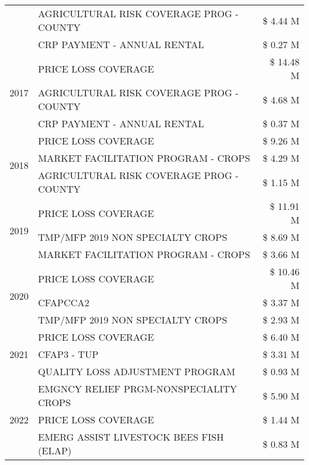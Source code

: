 \begin{tabular}{llr}
 & AGRICULTURAL RISK COVERAGE PROG - COUNTY & \$ 4.44 M \\
 & CRP PAYMENT - ANNUAL RENTAL & \$ 0.27 M \\
\cline{1-3}
\multirow[t]{3}{*}{2017} & PRICE LOSS COVERAGE & \$ 14.48 M \\
 & AGRICULTURAL RISK COVERAGE PROG - COUNTY & \$ 4.68 M \\
 & CRP PAYMENT - ANNUAL RENTAL & \$ 0.37 M \\
\cline{1-3}
\multirow[t]{3}{*}{2018} & PRICE LOSS COVERAGE & \$ 9.26 M \\
 & MARKET FACILITATION PROGRAM - CROPS & \$ 4.29 M \\
 & AGRICULTURAL RISK COVERAGE PROG - COUNTY & \$ 1.15 M \\
\cline{1-3}
\multirow[t]{3}{*}{2019} & PRICE LOSS COVERAGE & \$ 11.91 M \\
 & TMP/MFP 2019 NON SPECIALTY CROPS & \$ 8.69 M \\
 & MARKET FACILITATION PROGRAM - CROPS & \$ 3.66 M \\
\cline{1-3}
\multirow[t]{3}{*}{2020} & PRICE LOSS COVERAGE & \$ 10.46 M \\
 & CFAPCCA2 & \$ 3.37 M \\
 & TMP/MFP 2019 NON SPECIALTY CROPS & \$ 2.93 M \\
\cline{1-3}
\multirow[t]{3}{*}{2021} & PRICE LOSS COVERAGE & \$ 6.40 M \\
 & CFAP3 - TUP & \$ 3.31 M \\
 & QUALITY LOSS ADJUSTMENT PROGRAM & \$ 0.93 M \\
\cline{1-3}
\multirow[t]{3}{*}{2022} & EMGNCY RELIEF PRGM-NONSPECIALITY CROPS & \$ 5.90 M \\
 & PRICE LOSS COVERAGE & \$ 1.44 M \\
 & EMERG ASSIST LIVESTOCK BEES FISH (ELAP) & \$ 0.83 M \\
\cline{1-3}
\bottomrule
\end{tabular}
